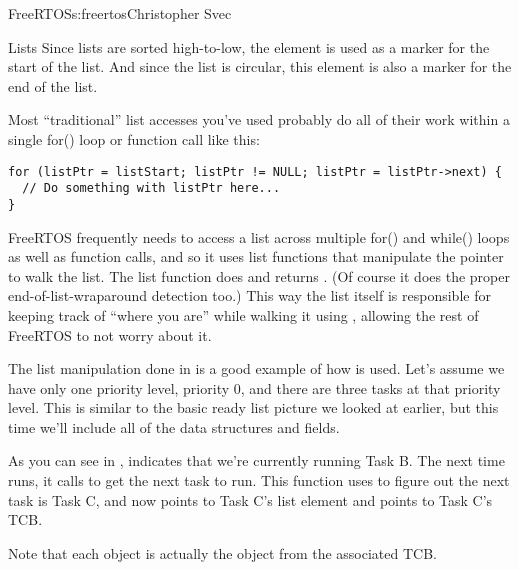\begin{aosachapter}{FreeRTOS}{s:freertos}{Christopher Svec}
\begin{aosasect1}{Lists}
Since lists are sorted high-to-low, the  element is
used as a marker for the start of the list.  And since the list is
circular, this  element is also a marker for the end of
the list.

Most ``traditional'' list accesses you've used probably do all of
their work within a single for() loop or function call like this:

\begin{verbatim}
for (listPtr = listStart; listPtr != NULL; listPtr = listPtr->next) {
  // Do something with listPtr here...
}
\end{verbatim}

FreeRTOS frequently needs to access a list across multiple for() and
while() loops as well as function calls, and so it uses list functions
that manipulate the  pointer to walk the list. The list
function  does  and returns . (Of
course it does the proper end-of-list-wraparound detection too.) This
way the list itself is responsible for keeping track of ``where you
are'' while walking it using , allowing the rest of
FreeRTOS to not worry about it.

The  list manipulation done in
 is a good example of how  is
used. Let's assume we have only one priority level, priority 0, and
there are three tasks at that priority level. This is similar to the
basic ready list picture we looked at earlier, but this time we'll
include all of the data structures and fields.


As you can see in , 
indicates that we're currently running Task B.  The next time
 runs, it calls
 to get the next task to
run. This function uses  to figure
out the next task is Task C, and now  points to Task C's
list element and  points to Task C's TCB.

Note that each  object is actually the
 object from the associated TCB.


\end{aosasect1}
\end{aosachapter}
